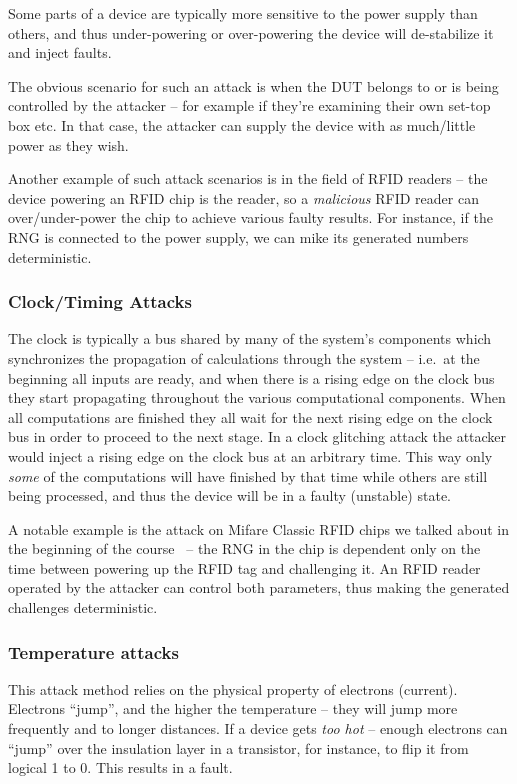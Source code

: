 Some parts of a device are typically more sensitive to the power supply than
others, and thus under-powering or over-powering the device will de-stabilize it and
inject faults.

The obvious scenario for such an attack is when the DUT belongs to or is being
controlled by the attacker -- for example if they're examining their own set-top
box etc. In that case, the attacker can supply the device with as much/little
power as they wish.

Another example of such attack scenarios is in the field of RFID readers -- the
device powering an RFID chip is the reader, so a \emph{malicious} RFID reader
can over/under-power the chip to achieve various faulty results. For instance,
if the RNG is connected to the power supply, we can mike its generated numbers
deterministic.

\subsubsection{Clock/Timing Attacks}\label{subsubsec:clock_timing_attacks}
The clock is typically a bus shared by many of the system's components which
synchronizes the propagation of calculations through the system -- i.e.\ at the
beginning all inputs are ready, and when there is a rising edge on the clock bus
they start propagating throughout the various computational components. When all
computations are finished they all wait for the next rising edge on the clock
bus in order to proceed to the next stage. In a clock glitching attack the
attacker would inject a rising edge on the clock bus at an arbitrary time. This
way only \emph{some} of the computations will have finished by that time while
others are still being processed, and thus the device will be in a faulty
(unstable) state.

A notable example is the attack on Mifare Classic RFID chips we talked about in
the beginning of the course~\cite{nohl2008} -- the RNG in the chip is dependent
only on the time between powering up the RFID tag and challenging it. An
RFID reader operated by the attacker can control both parameters, thus making
the generated challenges deterministic.

\subsubsection{Temperature attacks}\label{subsubsec:temperature_attacks}
This attack method relies on the physical property of electrons (current).
Electrons ``jump'', and the higher the temperature -- they will jump more
frequently and to longer distances. If a device gets \emph{too hot} -- enough
electrons can ``jump'' over the insulation layer in a transistor, for instance,
to flip it from logical 1 to 0. This results in a fault.

